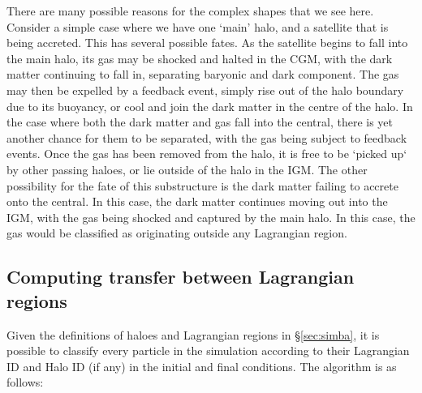 There are many possible reasons for the complex shapes that we see here.
Consider a simple case where we have one `main' halo, and a satellite that is
being accreted. This has several possible fates. As the satellite begins to
fall into the main halo, its gas may be shocked and halted in the CGM, with
the dark matter continuing to fall in, separating baryonic and dark
component. The gas may then be expelled by a feedback event, simply rise out
of the halo boundary due to its buoyancy, or cool and join the dark matter in
the centre of the halo. In the case where both the dark matter and gas fall
into the central, there is yet another chance for them to be separated, with
the gas being subject to feedback events. Once the gas has been removed from
the halo, it is free to be `picked up` by other passing haloes, or lie
outside of the halo in the IGM. The other possibility for the fate of this
substructure is the dark matter failing to accrete onto the central. In this
case, the dark matter continues moving out into the IGM, with the gas being
shocked and captured by the main halo. In this case, the gas would be
classified as originating outside any Lagrangian region.

\subsection{Computing transfer between Lagrangian regions}

Given the definitions of haloes and Lagrangian regions in
\S \ref{sec:simba}, it is possible to classify every particle in the
simulation according to their Lagrangian ID and Halo ID (if any) in the
initial and final conditions. The algorithm is as follows:

